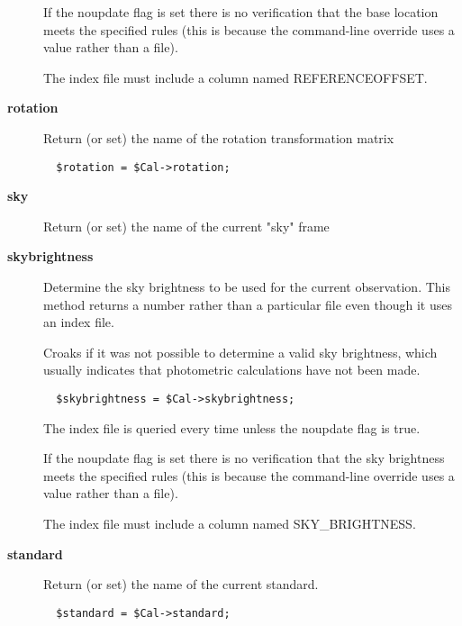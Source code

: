 \begin{description}
If the noupdate flag is set there is no verification that the base
location meets the specified rules (this is because the command-line
override uses a value rather than a file).



The index file must include a column named REFERENCEOFFSET.


\item[{\textbf{rotation}}] \mbox{}

Return (or set) the name of the rotation transformation matrix

\begin{verbatim}
  $rotation = $Cal->rotation;
\end{verbatim}

\item[{\textbf{sky}}] \mbox{}

Return (or set) the name of the current "sky" frame


\item[{\textbf{skybrightness}}] \mbox{}

Determine the sky brightness to be used for the current observation.
This method returns a number rather than a particular file even though
it uses an index file.



Croaks if it was not possible to determine a valid sky brightness,
which usually indicates that photometric calculations have not been
made.

\begin{verbatim}
  $skybrightness = $Cal->skybrightness;
\end{verbatim}


The index file is queried every time unless the noupdate flag is true.



If the noupdate flag is set there is no verification that the sky
brightness meets the specified rules (this is because the command-line
override uses a value rather than a file).



The index file must include a column named SKY\_BRIGHTNESS.


\item[{\textbf{standard}}] \mbox{}

Return (or set) the name of the current standard.

\begin{verbatim}
  $standard = $Cal->standard;
\end{verbatim}


\end{description}
